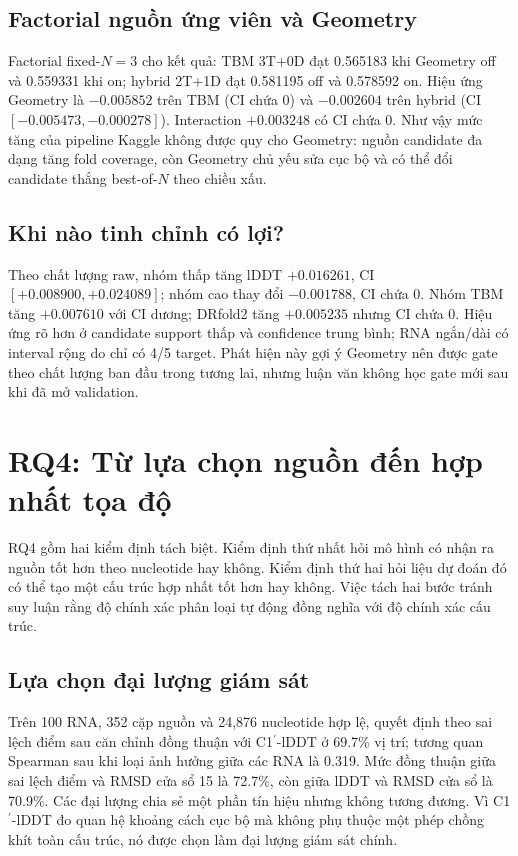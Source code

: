 \documentclass[12pt,a4paper,oneside]{report}
\newcommand{\cprime}{C1$^{\prime}$}
\begin{document}
\subsection{Factorial nguồn ứng viên và Geometry}

Factorial fixed-$N=3$ cho kết quả: TBM 3T+0D đạt 0.565183 khi Geometry off và 0.559331
khi on; hybrid 2T+1D đạt 0.581195 off và 0.578592 on. Hiệu ứng Geometry là
$-0.005852$ trên TBM (CI chứa 0) và $-0.002604$ trên hybrid (CI
$[-0.005473,-0.000278]$). Interaction $+0.003248$ có CI chứa 0. Như vậy mức tăng của
pipeline Kaggle không được quy cho Geometry: nguồn candidate đa dạng tăng fold coverage,
còn Geometry chủ yếu sửa cục bộ và có thể đổi candidate thắng best-of-$N$ theo chiều xấu.

\subsection{Khi nào tinh chỉnh có lợi?}

Theo chất lượng raw, nhóm thấp tăng lDDT $+0.016261$, CI
$[+0.008900,+0.024089]$; nhóm cao thay đổi $-0.001788$, CI chứa 0. Nhóm TBM tăng
$+0.007610$ với CI dương; DRfold2 tăng $+0.005235$ nhưng CI chứa 0. Hiệu ứng rõ hơn ở
candidate support thấp và confidence trung bình; RNA ngắn/dài có interval rộng do chỉ
có 4/5 target. Phát hiện này gợi ý Geometry nên được gate theo chất lượng ban đầu trong
tương lai, nhưng luận văn không học gate mới sau khi đã mở validation.

\iffalse
\section{RQ4: Từ lựa chọn nguồn đến hợp nhất tọa độ}

RQ4 gồm hai kiểm định tách biệt. Kiểm định thứ nhất hỏi mô hình có nhận ra nguồn tốt hơn
theo nucleotide hay không. Kiểm định thứ hai hỏi liệu dự đoán đó có thể tạo một cấu trúc
hợp nhất tốt hơn hay không. Việc tách hai bước tránh suy luận rằng độ chính xác phân loại
tự động đồng nghĩa với độ chính xác cấu trúc.

\subsection{Lựa chọn đại lượng giám sát}

Trên 100 RNA, 352 cặp nguồn và 24,876 nucleotide hợp lệ, quyết định theo sai lệch điểm
sau căn chỉnh đồng thuận với \cprime{}-lDDT ở 69.7\% vị trí; tương quan Spearman sau
khi loại ảnh hưởng giữa các RNA là 0.319. Mức đồng thuận giữa sai lệch điểm và RMSD cửa
sổ 15 là 72.7\%, còn giữa lDDT và RMSD cửa sổ là 70.9\%. Các đại lượng chia sẻ một phần
tín hiệu nhưng không tương đương. Vì \cprime{}-lDDT đo quan hệ khoảng cách cục bộ mà
không phụ thuộc một phép chồng khít toàn cấu trúc, nó được chọn làm đại lượng giám sát
chính.
\end{document}
